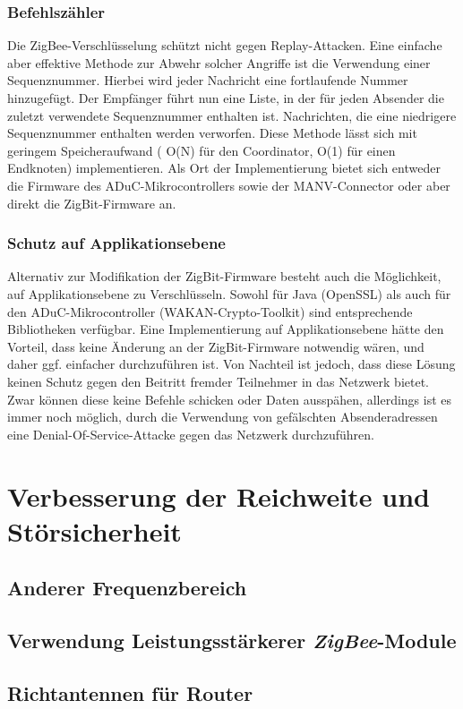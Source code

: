 \subsubsection{Befehlszähler}
Die ZigBee-Verschlüsselung schützt nicht gegen Replay-Attacken. Eine einfache aber effektive Methode zur Abwehr solcher
Angriffe ist die Verwendung einer Sequenznummer. Hierbei wird jeder Nachricht eine fortlaufende Nummer hinzugefügt. 
Der Empfänger führt nun eine Liste, in der für jeden Absender die zuletzt verwendete Sequenznummer enthalten ist.
Nachrichten, die eine niedrigere Sequenznummer enthalten werden verworfen. Diese Methode lässt sich mit geringem
Speicheraufwand ( O(N) für den Coordinator, O(1) für einen Endknoten) implementieren. Als Ort der Implementierung
bietet sich entweder die Firmware des ADuC-Mikrocontrollers sowie der MANV-Connector oder aber direkt die ZigBit-Firmware
an.

\subsubsection{Schutz auf Applikationsebene}
Alternativ zur Modifikation der ZigBit-Firmware besteht auch die Möglichkeit, auf Applikationsebene zu Verschlüsseln.
Sowohl für Java (OpenSSL) als auch für den ADuC-Mikrocontroller (WAKAN-Crypto-Toolkit) sind entsprechende Bibliotheken
verfügbar. Eine Implementierung auf Applikationsebene hätte den Vorteil, dass keine Änderung an der ZigBit-Firmware
notwendig wären, und daher ggf. einfacher durchzuführen ist. Von Nachteil ist jedoch, dass diese Lösung keinen Schutz
gegen den Beitritt fremder Teilnehmer in das Netzwerk bietet. Zwar können diese keine Befehle schicken oder Daten ausspähen,
allerdings ist es immer noch möglich, durch die Verwendung von gefälschten Absenderadressen eine Denial-Of-Service-Attacke
gegen das Netzwerk durchzuführen. 

\section{Verbesserung der Reichweite und Störsicherheit}
\subsection{Anderer Frequenzbereich}
\subsection{Verwendung Leistungsstärkerer \emph{ZigBee}-Module}
\subsection{Richtantennen für Router}

